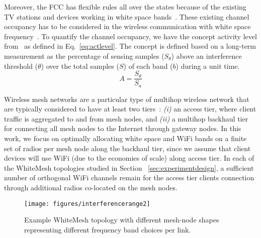 Moreover, the FCC has flexible rules all over the states because of the 
existing TV stations and devices working in white space bands~\cite{googledatabase}.
These existing channel occupancy has to be considered in the wireless communication with
white space frequency~\cite{fallah2010congestion}. To quantify the 
channel occupancy, we have the concept activity level from~\cite{cui2013leveraging}
as defined in Eq.~\ref{eq:actlevel}. The concept is defined based on a long-term measurement 
as the percentage of sensing samples ($S_\theta$) above an 
interference threshold ($\theta$) over the total samples ($S$) of each band ($b$) 
during a unit time. 
\begin{equation}
\label{eq:actlevel}
A=\frac{S_\theta}{S_a}
\end{equation}

Wireless mesh networks are a particular type of multihop wireless network
that are typically considered to have at least two
tiers~\cite{CRSK06}: {\it (i)} an access tier, where client traffic 
is aggregated to and from mesh nodes, and {\it (ii)} a multihop 
backhaul tier for connecting all mesh nodes to the Internet through 
gateway nodes. In this work, we focus on optimally allocating 
white space and WiFi bands on a finite set of radios per mesh node
along the backhaul tier, since we assume that client devices will use 
WiFi (due to the economies of scale) along access tier.  
In each of the WhiteMesh topologies studied in Section
~\ref{sec:experimentdesign}, a sufficient number of orthogonal WiFi 
channels remain for the access tier clients connection through additional 
radios co-located on the mesh nodes.

\begin{figure}
\vspace{-0.0in}
\centering
\texttt{[image: figures/interferencerange2]}
\vspace{-0.1in}
\caption{Example WhiteMesh topology with different mesh-node shapes 
representing different frequency band choices per link.}
\label{fig:interferencerange}
\vspace{-0.2in}
\end{figure}

